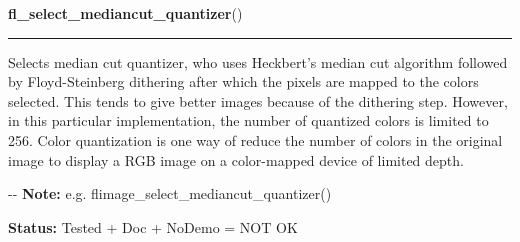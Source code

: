 \hspace{.8\funcindent}\begin{boxedminipage}{\funcwidth}

    \raggedright \textbf{fl\_select\_mediancut\_quantizer}()

    \vspace{-1.5ex}

    \rule{\textwidth}{0.5\fboxrule}
\setlength{\parskip}{2ex}

Selects median cut quantizer, who uses Heckbert's median cut algorithm
followed by Floyd-Steinberg dithering after which the pixels are mapped
to the colors selected. This tends to give better images because of the
dithering step. However, in this particular implementation, the number
of quantized colors is limited to 256. Color quantization is one way of
reduce the number of colors in the original image to display a RGB image
on a color-mapped device of limited depth.

-{}-
\setlength{\parskip}{1ex}
\textbf{Note:} 
e.g. flimage\_select\_mediancut\_quantizer()


\textbf{Status:} 
Tested + Doc + NoDemo = NOT OK


    \end{boxedminipage}

    \label{xformslib:flflimage:flimage_convolve}

    \vspace{0.5ex}

